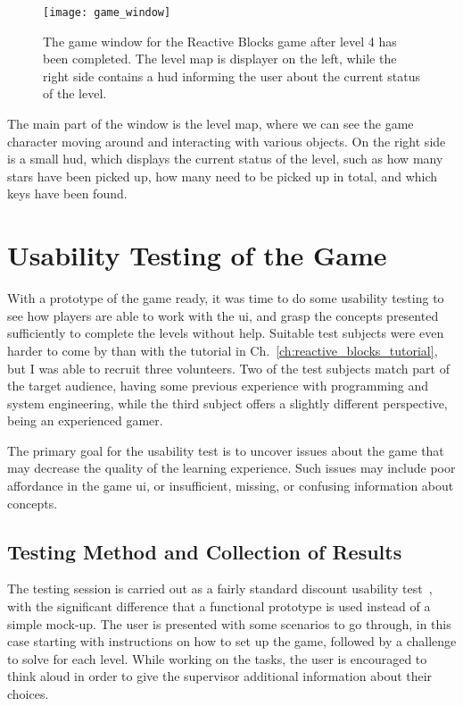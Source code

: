\begin{figure}[htp]
	\centering
	\texttt{[image: game\_window]}
	\caption[Reactive Blocks game window]{The game window for the Reactive Blocks game after level 4 has been completed. The level map is displayer on the left, while the right side contains a \gls{hud} informing the user about the current status of the level.}
	\label{fig:game_window}
\end{figure}

\noindent
The main part of the window is the level map, where we can see the game character moving around and interacting with various objects. On the right side is a small \gls{hud}, which displays the current status of the level, such as how many stars have been picked up, how many need to be picked up in total, and which keys have been found.

\section{Usability Testing of the Game}
\label{sec:game_testing}
With a prototype of the game ready, it was time to do some usability testing to see how players are able to work with the \gls{ui}, and grasp the concepts presented sufficiently to complete the levels without help. Suitable test subjects were even harder to come by than with the tutorial in Ch.~\ref{ch:reactive_blocks_tutorial}, but I was able to recruit three volunteers. Two of the test subjects match part of the target audience, having some previous experience with programming and system engineering, while the third subject offers a slightly different perspective, being an experienced gamer.

\noindent
The primary goal for the usability test is to uncover issues about the game that may decrease the quality of the learning experience. Such issues may include poor affordance in the game \gls{ui}, or insufficient, missing, or confusing information about concepts.

\subsection{Testing Method and Collection of Results}
\label{sec:game_testing_method}
The testing session is carried out as a fairly standard discount usability test~\cite{nielsen:discount_usability}, with the significant difference that a functional prototype is used instead of a simple mock-up. The user is presented with some scenarios to go through, in this case starting with instructions on how to set up the game, followed by a challenge to solve for each level. While working on the tasks, the user is encouraged to think aloud in order to give the supervisor additional information about their choices.

